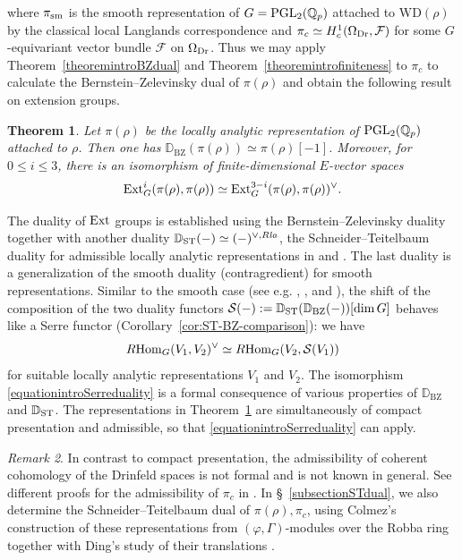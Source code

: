 \documentclass[a4paper,10pt]{amsart}
\newtheorem{theorem}{Theorem}[section]
\theoremstyle{remark}
\newtheorem{remark}[theorem]{Remark}
\theoremstyle{definition}
\theoremstyle{plain}
\numberwithin{equation}{section}
\newcommand{\bbD}{{\mathbb D}}
\newcommand{\bbQ}{{\mathbb Q}}
\newcommand{\calF}{{\mathcal F}}
\newcommand{\calS}{{\mathcal S}}
\newcommand{\Ext}{{\rm Ext}}
\newcommand{\Hom}{{\rm Hom}}
\newcommand{\la}{{\it la}}
\newcommand{\PGL}{{\rm PGL}}
\newcommand{\sm}{{\rm sm}}
\newcommand{\ST}{{\rm ST}}
\newcommand{\BZ}{\ensuremath{\mathrm{BZ}}}
\begin{document}
where $\pi_{\sm}$ is the smooth representation of $G=\PGL_2(\bbQ_p)$ attached to $\mathrm{WD}(\rho)$ by the classical local Langlands correspondence and $\pi_c\simeq H^1_c(\Omega_{\rm Dr},\calF)$ for some $G$-equivariant vector bundle $\calF$ on $\Omega_{\rm Dr}$. Thus we may apply Theorem~\ref{theoremintroBZdual} and Theorem~\ref{theoremintrofiniteness} to $\pi_c$ to calculate the Bernstein--Zelevinsky dual of $\pi(\rho)$ and obtain the following result on extension groups.
\begin{theorem}\label{thmintrodualextgroup}
	Let $\pi(\rho)$ be the locally analytic representation of $\PGL_2(\bbQ_p)$ attached to $\rho$. Then one has $\bbD_{\BZ}(\pi(\rho))\simeq \pi(\rho)[-1]$. Moreover, for $0\leq i\leq 3$, there is an isomorphism of finite-dimensional $E$-vector spaces
	\[\Ext^i_{G}(\pi(\rho),\pi(\rho))\simeq \Ext^{3-i}_{G}(\pi(\rho),\pi(\rho))^{\vee}.\]
\end{theorem}
The duality of $\Ext$ groups is established using the Bernstein--Zelevinsky duality together with another duality $\bbD_{\ST}(-)\simeq (-)^{\vee, R\la}$, the Schneider--Teitelbaum duality for admissible locally analytic representations in \cite{ST05} and \cite[\S~4.2]{JC23}. The last duality is a generalization of the smooth duality (contragredient) for smooth representations. Similar to the smooth case (see e.g. \cite{bondal1990representable}, \cite[\S~0.1]{gaitsgoryYomDin2018deligne}, \cite[Rem.~7.54]{zhu2025tame} and \cite{hansen2026Serrefunctor}), the shift of the composition of the two duality functors $\calS(-):=\bbD_{\ST}(\bbD_{\BZ}(-))[\dim G]$ behaves like a Serre functor (Corollary~\ref{cor:ST-BZ-comparison}): we have
\begin{equation}\label{equationintroSerreduality}
	R\Hom_G(V_1,V_2)^{\vee}\simeq R\Hom_G(V_2,\calS(V_1))
\end{equation}
for suitable locally analytic representations $V_1$ and $V_2$. The isomorphism \eqref{equationintroSerreduality} is a formal consequence of various properties of $\bbD_{\BZ}$ and $\bbD_{\ST}$. The representations in Theorem~\ref{thmintrodualextgroup} are simultaneously of compact presentation and admissible, so that \eqref{equationintroSerreduality} can apply. 
\begin{remark}
	In contrast to compact presentation, the admissibility of coherent cohomology of the Drinfeld spaces is not formal and is not known in general. See different proofs for the admissibility of $\pi_c$ in \cite{dospinescuLeBras2017revetements,pan2026completed,ardakovWadsley2023globalsections}. In \S~\ref{subsectionSTdual}, we also determine the Schneider--Teitelbaum dual of $\pi(\rho),\pi_c$, using Colmez's construction of these representations from $(\varphi,\Gamma)$-modules over the Robba ring \cite{colmez2016representations} together with Ding's study of their translations \cite{ding2023change}.
\end{remark}
\end{document}
